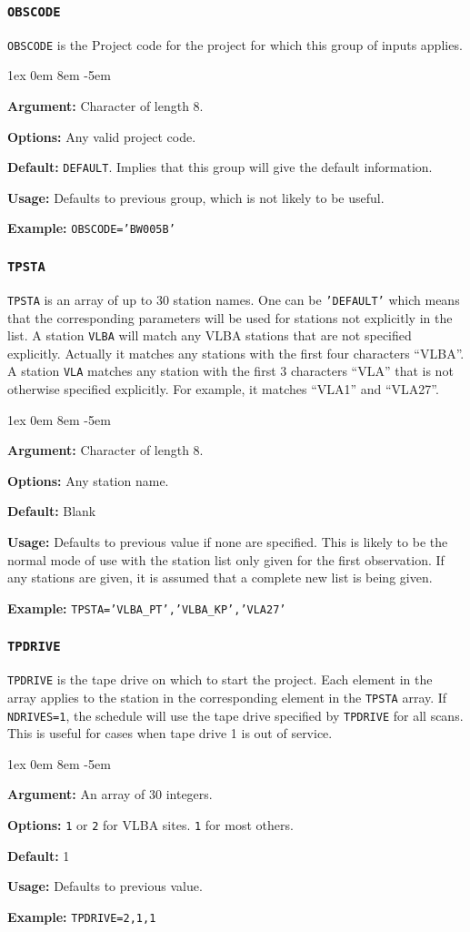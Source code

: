 \documentclass{report}
\newcommand{\rcwbox}[5]{
  \begin{list}{}{\parsep 1ex  \itemsep 0em
                 \leftmargin 8em  \itemindent -5em }
    \item {\bf Argument:} #1
    \item {\bf Options:}  #2
    \item {\bf Default:}  #3
    \item {\bf Usage:}    #4
    \item {\bf Example:}  #5
  \end{list}
}
\begin{document}
\subsubsection{\label{TP:OBSCODE}{\tt OBSCODE}}

{\tt OBSCODE} is the Project code for the project for which this
group of inputs applies.

\rcwbox
{Character of length 8.}
{Any valid project code.}
{{\tt DEFAULT}. Implies that this group will give the default
information.}
{Defaults to previous group, which is not likely to be useful.}
{{\tt OBSCODE='BW005B'}}

\subsubsection{\label{TP:TPSTA}{\tt TPSTA}}

{\tt TPSTA} is an array of up to 30 station names. One can be
{\tt 'DEFAULT'} which means that the corresponding parameters will be
used for stations not explicitly in the list.  A station {\tt VLBA}
will match any VLBA stations that are not specified explicitly.  Actually
it matches any stations with the first four characters ``VLBA''.
A station {\tt VLA} matches any station with the first 3 characters
``VLA'' that is not otherwise specified explicitly.  For example, it
matches ``VLA1'' and ``VLA27''.

\rcwbox
{Character of length 8.}
{Any station name.}
{Blank}
{Defaults to previous value if none are specified. This is likely to
be the normal mode of use with the station list only given for the
first observation. If any stations are given, it is assumed that a
complete new list is being given.}
{{\tt TPSTA='VLBA\_PT','VLBA\_KP','VLA27'}}

\subsubsection{\label{TP:TPDRIVE}{\tt TPDRIVE}}

{\tt TPDRIVE} is the tape drive on which to start the project. Each
element in the array applies to the station in the corresponding
element in the {\tt TPSTA} array. If {\tt NDRIVES=1}, the schedule
will use the tape drive specified by {\tt TPDRIVE} for all scans. This
is useful for cases when tape drive 1 is out of service.

\rcwbox
{An array of 30 integers.}
{{\tt 1} or {\tt 2} for VLBA sites. {\tt 1} for most others.}
{1}
{Defaults to previous value.}
{{\tt TPDRIVE=2,1,1}}
\end{document}
